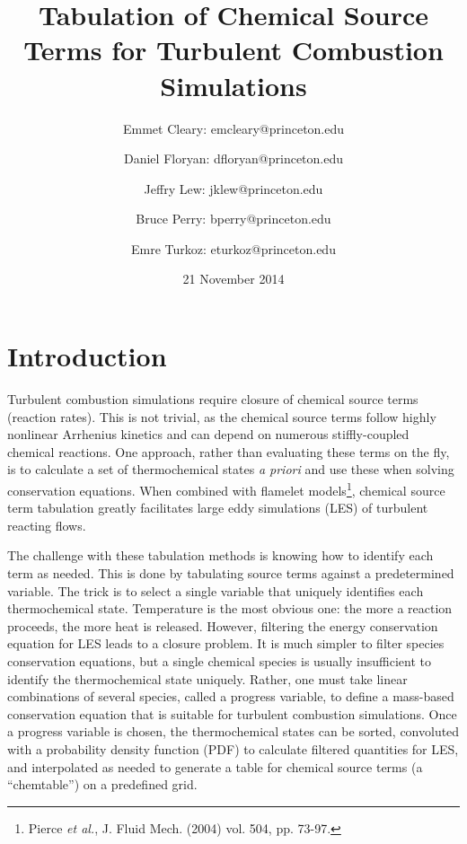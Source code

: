 \documentclass[11pt]{article}
\begin{document}
\title{\textbf{Tabulation of Chemical Source Terms for Turbulent
    Combustion Simulations}}

\author{Emmet Cleary: emcleary@princeton.edu \and Daniel Floryan:
  dfloryan@princeton.edu \and Jeffry Lew: jklew@princeton.edu \and
  Bruce Perry: bperry@princeton.edu \and Emre Turkoz:
  eturkoz@princeton.edu} 

\date{21 November 2014 }
\maketitle

\section{Introduction}
Turbulent combustion simulations require closure of chemical source terms (reaction rates). This is not trivial, as the chemical source terms follow highly nonlinear Arrhenius kinetics and can depend on numerous stiffly-coupled chemical reactions. One approach, rather than evaluating these terms on the fly, is to calculate a set of thermochemical states \textit{a priori} and use these when solving conservation equations. When combined with flamelet models\footnote{Pierce \textit{et al.}, J. Fluid Mech. (2004) vol. 504, pp. 73-97.}, chemical source term tabulation greatly facilitates large eddy simulations (LES) of turbulent reacting flows.

The challenge with these tabulation methods is knowing how to identify each term as needed.  This is done by tabulating source terms against a predetermined variable. The trick is to select a single variable that uniquely identifies each thermochemical state. Temperature is the most obvious one: the more a reaction proceeds, the more heat is released. However, filtering the energy conservation equation for LES leads to a closure problem. It is much simpler to filter species conservation equations, but a single chemical species is usually insufficient to identify the thermochemical state uniquely. Rather, one must take linear combinations of several species, called a progress variable, to define a mass-based conservation equation that is suitable for turbulent combustion simulations. Once a progress variable is chosen, the thermochemical states can be sorted, convoluted with a probability density function (PDF) to calculate filtered quantities for LES, and interpolated as needed to generate a table for chemical source terms (a “chemtable”) on a predefined grid.
\end{document}
